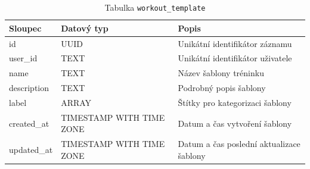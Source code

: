\begin{table}[ht!]
    \centering
    \begin{tabularx}{\textwidth}{|l|l|L|}
        \hline
        \textbf{Sloupec} & \textbf{Datový typ}      & \textbf{Popis}                           \\ \hline
        id               & UUID                     & Unikátní identifikátor záznamu           \\ \hline
        user\_id         & TEXT                     & Unikátní identifikátor uživatele         \\ \hline
        name             & TEXT                     & Název šablony tréninku                   \\ \hline
        description      & TEXT                     & Podrobný popis šablony                   \\ \hline
        label            & ARRAY                    & Štítky pro kategorizaci šablony          \\ \hline
        created\_at      & TIMESTAMP WITH TIME ZONE & Datum a čas vytvoření šablony            \\ \hline
        updated\_at      & TIMESTAMP WITH TIME ZONE & Datum a čas poslední aktualizace šablony \\ \hline
    \end{tabularx}
    \caption{Tabulka \texttt{workout\_template}}
    \label{tab:workout_template}
\end{table}
